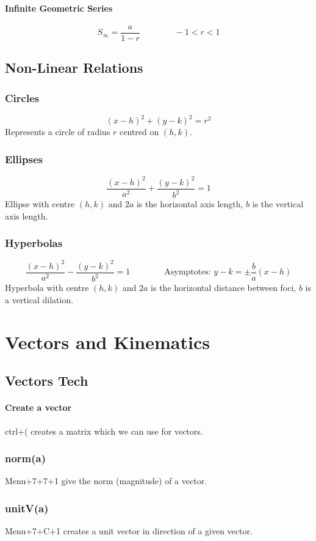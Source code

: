 \documentclass[a4paper,twoside]{article}
\begin{document}
			\paragraph{Infinite Geometric Series}
			\[
				S_\infty=\frac{a}{1-r}\qquad\qquad -1<r<1
			\]
		\subsection{Non-Linear Relations}
			\subsubsection{Circles}
				\[
					(x-h)^2+(y-k)^2=r^2
				\]
				Represents a circle of radius $r$ centred on $(h,k)$.
			\subsubsection{Ellipses}
				\[
					\frac{(x-h)^2}{a^2}+\frac{(y-k)^2}{b^2}=1
				\]
				Ellipse with centre $(h,k)$ and $2a$ is the horizontal axis length, $b$ is the vertical axis length.
			\subsubsection{Hyperbolas}
				\[
					\frac{(x-h)^2}{a^2}-\frac{(y-k)^2}{b^2}=1\qquad\qquad\text{Asymptotes: }y-k=\pm\frac{b}{a}(x-h)
				\]
				Hyperbola with centre $(h,k)$ and $2a$ is the horizontal distance between foci, $b$ is a vertical dilation.
	\section{Vectors and Kinematics}
		\subsection{Vectors Tech}
			\paragraph{Create a vector} ctrl+( creates a matrix which we can use for vectors.
			\subsubsection{norm(a)} Menu+7+7+1 give the norm (magnitude) of a vector.
			\subsubsection{unitV(a)} Menu+7+C+1 creates a unit vector in direction of a given vector.
\end{document}
